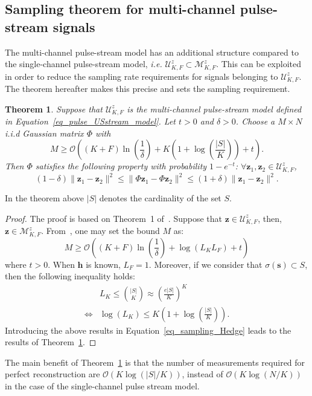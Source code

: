 \documentclass{article}
\newtheorem{theorem}{Theorem}
\newcommand{\ie}{\textit{i.e.}}
\newcommand{\vect}[1]{\bm{#1}}
\newcommand{\mat}[1]{\mathsf{#1}}
\theoremstyle{definition}
\begin{document}
\subsection{Sampling theorem for multi-channel pulse-stream signals}
\label{subsec_sampling_pulse_stream}
The multi-channel pulse-stream model has an additional structure compared to the single-channel pulse-stream model, \ie{} $\mathcal{U}^z_{K,F} \subset \mathcal{M}^z_{K,F}$. This can be exploited in order to reduce the sampling rate requirements for signals belonging to $\mathcal{U}^z_{K,F}$. The theorem hereafter makes this precise and sets the sampling requirement.
\begin{theorem}
	\label{th_stream_pulse_us}
	Suppose that $\mathcal{U}^z_{K,F}$ is the multi-channel pulse-stream model defined in Equation~\eqref{eq_pulse_USstream_model}. Let $t > 0$ and $\delta > 0$. Choose a $M \times N$ i.i.d Gaussian matrix $\mat{\Phi}$ with 
	\begin{equation*}
	M \geq \mathcal{O} \left(\left(K + F\right) \ln \left(\frac{1}{\delta} \right) + K \left( 1 + \log \left(\frac{|S|}{K}\right)\right) + t\right).
	\end{equation*} 
	Then $\mat{\Phi}$ satisfies the following property with probability $1-e^{-t}$: $\forall \vect{z}_1, \vect{z}_2 \in \mathcal{U}^z_{K,F}$, 
	\begin{equation*}
	\left(1- \delta\right) \| \vect{z}_1 - \vect{z}_2\|^2 \leq \| \mat{\Phi} \vect{z}_1 - \mat{\Phi} \vect{z}_2\|^2\leq \left(1+ \delta\right) \| \vect{z}_1 - \vect{z}_2\|^2.
	\end{equation*}
\end{theorem}
In the theorem above $|S|$ denotes the cardinality of the set $S$.
\begin{proof}
	The proof is based on Theorem~\num{1} of~\cite{Hedge_TSP_2011}. Suppose that $\vect{z} \in \mathcal{U}^z_{K,F}$, then, $\vect{z} \in \mathcal{M}^z_{K,F}$. From~\cite{Hedge_TSP_2011}, one may set the bound $M$ as:
	\begin{equation}
		\label{eq_sampling_Hedge}
		M \geq \mathcal{O} \left(\left(K + F\right) \ln \left(\frac{1}{\delta}\right) + \log \left(L_K L_F\right) + t\right)
	\end{equation} 
	where $t > 0$. When $\vect{h}$ is known, $L_F = 1$. Moreover, if we consider that $\sigma \left(\vect{s}\right) \subset S$, then the following inequality holds:
	\begin{align*}
		&L_K \leq {{|S|}\choose{K}} \approx \left(\frac{e|S|}{K}\right)^K \\
		\Leftrightarrow & \log \left(L_K\right) \leq K \left(1 + \log\left(\frac{|S|}{K}\right)\right).
	\end{align*}
	Introducing the above results in Equation~\eqref{eq_sampling_Hedge} leads to the results of Theorem~\ref{th_stream_pulse_us}.
\end{proof}
The main benefit of Theorem~\ref{th_stream_pulse_us} is that the number of measurements required for perfect reconstruction are $\mathcal{O}\left(K \log \left(|S|/K\right)\right)$, instead of $\mathcal{O}\left(K \log \left(N/K\right)\right)$ in the case of the single-channel pulse stream model.
\end{document}
